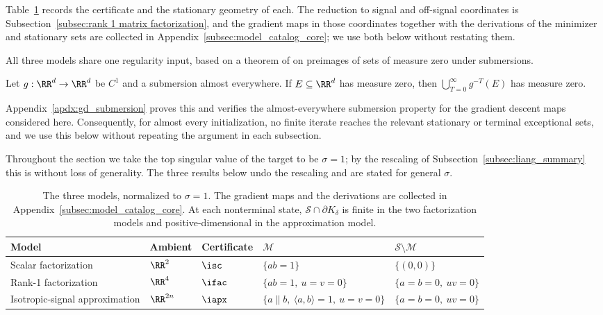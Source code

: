 \documentclass{article}
\begin{document}
Table~\ref{tab:three_models} records the certificate and the stationary
geometry of each. The reduction to signal and off-signal coordinates is
Subsection~\ref{subsec:rank 1 matrix factorization}, and the gradient maps in
those coordinates together with the derivations of the minimizer and stationary
sets are collected in Appendix~\ref{subsec:model_catalog_core}; we use both
below without restating them.

All three models share one regularity input, based on a theorem
of \cite{ponomarev1987submersions} on preimages of sets of measure zero under
submersions.

\begin{corollary}
\label{cor:gd_preimage_null}
Let $g:\RR^d\to\RR^d$ be $C^1$ and a submersion almost everywhere. If
$E\subseteq\RR^d$ has measure zero, then
$\bigcup_{T=0}^\infty g^{-T}(E)$ has measure zero.
\end{corollary}

Appendix~\ref{apdx:gd_submersion} proves this and verifies the
almost-everywhere submersion property for the gradient descent maps considered
here. Consequently, for almost every initialization, no finite iterate reaches
the relevant stationary or terminal exceptional sets, and we use this below
without repeating the argument in each subsection.

Throughout the section we take the top singular value of the target to be
$\sigma=1$; by the rescaling of Subsection~\ref{subsec:liang_summary} this is
without loss of generality. The three results below undo the rescaling and are
stated for general $\sigma$.

\begin{table}[t]
\centering
\scriptsize
\setlength{\tabcolsep}{5pt}
\caption{The three models, normalized to $\sigma=1$. The gradient maps and the
derivations are collected in Appendix~\ref{subsec:model_catalog_core}. At each
nonterminal state, $\mathcal S\cap\partial K_\delta$ is finite in the two
factorization models and positive-dimensional in the approximation model.}
\label{tab:three_models}
\begin{tabular}{@{}lllll@{}}
\toprule
Model & Ambient & Certificate & $\mathcal M$ & $\mathcal S\setminus\mathcal M$\\
\midrule
Scalar factorization & $\RR^2$ & $\isc$ & $\{ab=1\}$ & $\{(0,0)\}$\\
Rank-1 factorization & $\RR^4$ & $\ifac$ & $\{ab=1,\ u=v=0\}$ & $\{a=b=0,\ uv=0\}$\\
Isotropic-signal approximation & $\RR^{2n}$ & $\iapx$ & $\{a\parallel b,\ \langle a,b\rangle=1,\ u=v=0\}$ & $\{a=b=0,\ uv=0\}$\\
\bottomrule
\end{tabular}
\end{table}
\end{document}
